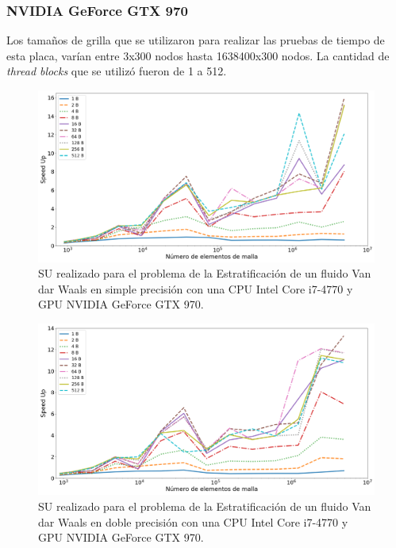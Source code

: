 \newpage

\subsubsection{NVIDIA GeForce GTX 970}

Los tamaños de grilla que se utilizaron para realizar las pruebas de tiempo de esta placa, varían entre 3x300 nodos hasta 1638400x300 nodos. La cantidad de \textit{thread blocks} que se utilizó fueron de 1 a 512.


\begin{figure}[h!]
	\centering
	\includegraphics[width=\textwidth]{figs/cap4/s_970_VdW_simple_10}
	\caption{SU realizado para el problema de la Estratificación de un fluido Van dar Waals en simple precisión con una CPU Intel Core i7-4770 y GPU NVIDIA GeForce GTX 970.} 
	\label{fig:s_970_VdW_simple_10}	
\end{figure}

\begin{figure}[h!]
	\centering
	\includegraphics[width=\textwidth]{figs/cap4/s_970_VdW_double_10}
	\caption{SU realizado para el problema de la Estratificación de un fluido Van dar Waals en doble precisión con una CPU Intel Core i7-4770 y GPU NVIDIA GeForce GTX 970.} 
	\label{fig:s_970_VdW_double_10}	
\end{figure}

